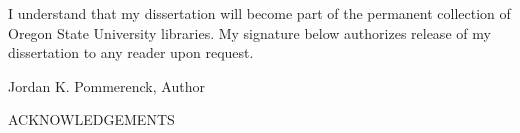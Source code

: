 \vspace{3.0cm}
\justify{}
I understand that my dissertation will become part of the permanent collection
of Oregon State University libraries. My signature below authorizes release of my
dissertation to any reader upon request. \\
\vspace{0.5cm}
\begin{flushleft}
\underline{\hspace{15cm}}
\end{flushleft}
\centering{}
Jordan K. Pommerenck, Author

\newpage{}
\thispagestyle{empty}
\begin{center}
	\large
	ACKNOWLEDGEMENTS
\end{center}
\justify{}
\doublespacing
{}

